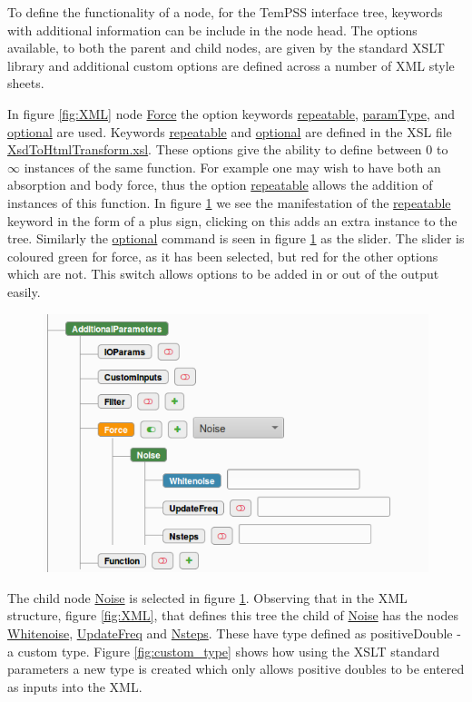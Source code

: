 \documentclass[11pt, a4paper]{report}
\begin{document}
To define the functionality of a node, for the TemPSS interface tree, keywords with additional information can be include in the node head. The options available, to both the parent and child nodes, are given by the standard XSLT library and additional custom options are defined across a number of XML style sheets. 

In figure \ref{fig:XML} node \url{Force} the option keywords \url{repeatable}, \url{paramType}, and \url{optional} are used. Keywords \url{repeatable} and \url{optional} are defined in the XSL file \url{XsdToHtmlTransform.xsl}. These options give the ability to define between $0$ to $\infty$ instances of the same function. For example one may wish to have both an absorption and body force, thus the option \url{repeatable} allows the addition of instances of this function. In figure \ref{fig:force_tree} we see the manifestation of the \url{repeatable} keyword in the form of a plus sign, clicking on this adds an extra instance to the tree. Similarly the \url{optional} command is seen in figure \ref{fig:force_tree} as the slider. The slider is coloured green for force, as it has been selected, but red for the other options which are not. This switch allows options to be added in or out of the output easily.

\begin{figure}[htb!]
 \centering
 \includegraphics[width=.75\linewidth,  clip=true, trim = 0cm 0cm 0cm 0cm]{force_tree}
 \label{fig:force_tree}
\end{figure}

The child node \url{Noise} is selected in figure \ref{fig:force_tree}. Observing that in the XML structure, figure \ref{fig:XML}, that defines this tree the child of \url{Noise} has the nodes \url{Whitenoise}, \url{UpdateFreq} and \url{Nsteps}. These have type defined as positiveDouble - a custom type. Figure \ref{fig:custom_type} shows how using the XSLT standard parameters a new type is created which only allows positive doubles to be entered as inputs into the XML.
\end{document}
